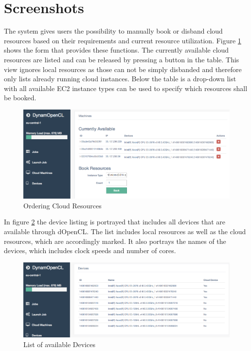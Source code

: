 \section{Screenshots}

The system gives users the possibility to manually book or disband cloud resources based on their requirements and current resource utilization. Figure \ref{img:machine_order} shows the form that provides these functions. The currently available cloud resources are listed and can be released by pressing a button in the table. This view ignores local resources as those can not be simply disbanded and therefore only lists already running cloud instances. Below the table is a drop-down list with all available EC2 instance types can be used to specify which resources shall be booked.

\begin{figure}[H]
	\includegraphics[width=1\textwidth]{screenshots/machine_order.png}
	\centering
	\caption{Ordering Cloud Resources}
	\label{img:machine_order}
\end{figure}

In figure \ref{img:available_devices} the device listing is portrayed that includes all devices that are available through dOpenCL. The list includes local resources as well as the cloud resources, which are accordingly marked. It also portrays the names of the devices, which includes clock speeds and number of cores. 

\begin{figure}[H]
	\includegraphics[width=1\textwidth]{screenshots/available_devices.png}
	\centering
	\caption{List of available Devices}
	\label{img:available_devices}
\end{figure}

